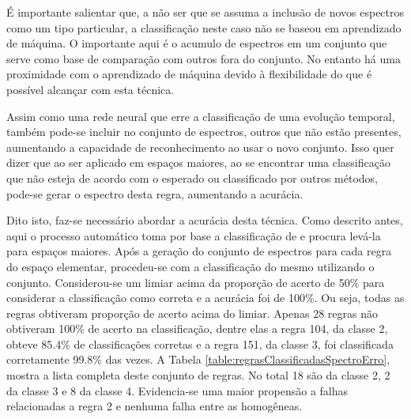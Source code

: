\documentclass[12pt,a4paper]{report}
\begin{document}
	É importante salientar que, a não ser que se assuma a inclusão de novos espectros como um tipo particular, a classificação neste caso não se baseou em aprendizado de máquina. O importante aqui é o acumulo de espectros em um conjunto que serve como base de comparação com outros fora do conjunto. No entanto há uma proximidade com o aprendizado de máquina devido à flexibilidade do que é possível alcançar com esta técnica.
	
	Assim como uma rede neural que erre a classificação de uma evolução temporal, também pode-se incluir no conjunto de espectros, outros que não estão presentes, aumentando a capacidade de reconhecimento ao usar o novo conjunto. Isso quer dizer que ao ser aplicado em espaços maiores, ao se encontrar uma classificação que não esteja de acordo com o esperado ou classificado por outros métodos, pode-se gerar o espectro desta regra, aumentando a acurácia. 
	
	Dito isto, faz-se necessário abordar a acurácia desta técnica. Como descrito antes, aqui o processo automático toma por base a classificação de  e procura levá-la para espaços maiores. Após a geração do conjunto de espectros para cada regra do espaço elementar, procedeu-se com a classificação do mesmo utilizando o conjunto. Considerou-se um limiar acima da proporção de acerto de 50\% para considerar a classificação como correta e a acurácia foi de 100\%. Ou seja, todas as regras obtiveram proporção de acerto acima do limiar. Apenas 28 regras não obtiveram 100\% de acerto na classificação, dentre elas a regra 104, da classe 2, obteve 85.4\% de classificações corretas e a regra 151, da classe 3, foi classificada corretamente 99.8\% das vezes. A Tabela \ref{table:regrasClassificadasSpectroErro}, mostra a lista completa deste conjunto de regras. No total 18 são da classe 2, 2 da classe 3 e 8 da classe 4. Evidencia-se uma maior propensão a falhas relacionadas a regra 2 e nenhuma falha entre as homogêneas.
\end{document}
